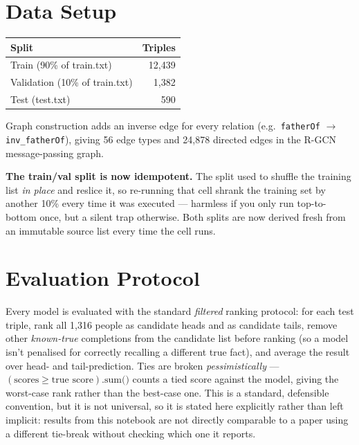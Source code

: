 \documentclass[11pt,a4paper]{article}
\newcommand{\rel}[1]{\texttt{\small #1}}
\begin{document}
\section{Data Setup}

\begin{center}
\begin{tabular}{lr}
\toprule
\textbf{Split} & \textbf{Triples} \\
\midrule
Train (90\% of train.txt) & 12{,}439 \\
Validation (10\% of train.txt) & 1{,}382 \\
Test (test.txt) & 590 \\
\bottomrule
\end{tabular}
\end{center}

Graph construction adds an inverse edge for every relation (e.g.\
\rel{fatherOf} $\to$ \rel{inv\_fatherOf}), giving 56 edge types and
24{,}878 directed edges in the R-GCN message-passing graph.

\begin{why}
\textbf{The train/val split is now idempotent.} The split used to shuffle
the training list \emph{in place} and reslice it, so re-running that cell
shrank the training set by another 10\% every time it was executed ---
harmless if you only run top-to-bottom once, but a silent trap otherwise.
Both splits are now derived fresh from an immutable source list every
time the cell runs.
\end{why}

\section{Evaluation Protocol}

Every model is evaluated with the standard \emph{filtered} ranking
protocol: for each test triple, rank all 1{,}316 people as candidate
heads and as candidate tails, remove other \emph{known-true} completions
from the candidate list before ranking (so a model isn't penalised for
correctly recalling a different true fact), and average the result over
head- and tail-prediction. Ties are broken \emph{pessimistically} ---
$(\text{scores} \geq \text{true score}).\text{sum()}$ counts a tied score
against the model, giving the worst-case rank rather than the best-case
one. This is a standard, defensible convention, but it is not universal,
so it is stated here explicitly rather than left implicit: results from
this notebook are not directly comparable to a paper using a different
tie-break without checking which one it reports.
\end{document}
